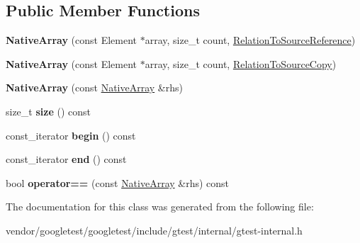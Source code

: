 \subsection*{Public Member Functions}
\begin{DoxyCompactItemize}
\item 
{\bfseries Native\+Array} (const Element $\ast$array, size\+\_\+t count, \hyperlink{structtesting_1_1internal_1_1RelationToSourceReference}{Relation\+To\+Source\+Reference})\hypertarget{classtesting_1_1internal_1_1NativeArray_a52b3689c62532703d11e9d82939a7141}{}\label{classtesting_1_1internal_1_1NativeArray_a52b3689c62532703d11e9d82939a7141}

\item 
{\bfseries Native\+Array} (const Element $\ast$array, size\+\_\+t count, \hyperlink{structtesting_1_1internal_1_1RelationToSourceCopy}{Relation\+To\+Source\+Copy})\hypertarget{classtesting_1_1internal_1_1NativeArray_ac184ee5741af5be3402213819c834405}{}\label{classtesting_1_1internal_1_1NativeArray_ac184ee5741af5be3402213819c834405}

\item 
{\bfseries Native\+Array} (const \hyperlink{classtesting_1_1internal_1_1NativeArray}{Native\+Array} \&rhs)\hypertarget{classtesting_1_1internal_1_1NativeArray_abb346ac3040f5da733f594cc2d5958bc}{}\label{classtesting_1_1internal_1_1NativeArray_abb346ac3040f5da733f594cc2d5958bc}

\item 
size\+\_\+t {\bfseries size} () const \hypertarget{classtesting_1_1internal_1_1NativeArray_a45de2485baac8bf148e2943828094a40}{}\label{classtesting_1_1internal_1_1NativeArray_a45de2485baac8bf148e2943828094a40}

\item 
const\+\_\+iterator {\bfseries begin} () const \hypertarget{classtesting_1_1internal_1_1NativeArray_a49c534d29034d9230372ada54ef961bb}{}\label{classtesting_1_1internal_1_1NativeArray_a49c534d29034d9230372ada54ef961bb}

\item 
const\+\_\+iterator {\bfseries end} () const \hypertarget{classtesting_1_1internal_1_1NativeArray_a4957ad1ebf7c21eab07d5e0ae2bb17aa}{}\label{classtesting_1_1internal_1_1NativeArray_a4957ad1ebf7c21eab07d5e0ae2bb17aa}

\item 
bool {\bfseries operator==} (const \hyperlink{classtesting_1_1internal_1_1NativeArray}{Native\+Array} \&rhs) const \hypertarget{classtesting_1_1internal_1_1NativeArray_a60af8d9c429771ee131b5ddf7e06e3c9}{}\label{classtesting_1_1internal_1_1NativeArray_a60af8d9c429771ee131b5ddf7e06e3c9}

\end{DoxyCompactItemize}


The documentation for this class was generated from the following file\+:\begin{DoxyCompactItemize}
\item 
vendor/googletest/googletest/include/gtest/internal/gtest-\/internal.\+h\end{DoxyCompactItemize}
